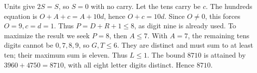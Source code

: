 Units give $2S=S$, so $S=0$ with no carry. Let the tens carry be $c$. The hundreds equation is $O+A+c=A+10d$, hence $O+c=10d$. Since $O\ne0$, this forces $O=9,c=d=1$. Thus $P=D+R+1\le8$, as digit nine is already used. To maximize the result we seek $P=8$, then $A\le7$. With $A=7$, the remaining tens digits cannot be $0,7,8,9$, so $G,T\le6$. They are distinct and must sum to at least ten; their maximum sum is eleven. Thus $L\le1$. The bound $8710$ is attained by $3960+4750=8710$, with all eight letter digits distinct. Hence $\boxed{8710}$.
